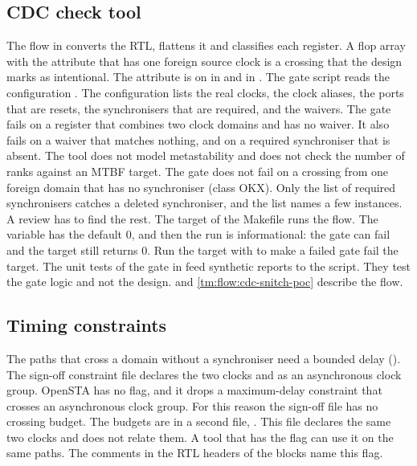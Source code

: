 \subsection*{CDC check tool}
The flow in  converts the RTL, flattens it and classifies each register. A flop array with the attribute  that has one foreign source clock is a crossing that the design marks as intentional. The attribute is on  in  and in . The gate script  reads the configuration . The configuration lists the real clocks, the clock aliases, the ports that are resets, the synchronisers that are required, and the waivers. The gate fails on a register that combines two clock domains and has no waiver. It also fails on a waiver that matches nothing, and on a required synchroniser that is absent. The tool does not model metastability and does not check the number of ranks against an MTBF target. The gate does not fail on a crossing from one foreign domain that has no synchroniser (class OKX). Only the list of required synchronisers catches a deleted synchroniser, and the list names a few instances. A review has to find the rest. The target  of the  Makefile runs the flow. The variable  has the default 0, and then the run is informational: the gate can fail and the target still returns 0. Run the target with  to make a failed gate fail the target. The unit tests of the gate in  feed synthetic reports to the script. They test the gate logic and not the design.  and \cref{tm:flow:cdc-snitch-poc} describe the flow.

\subsection*{Timing constraints}
The paths that cross a domain without a synchroniser need a bounded delay (). The sign-off constraint file  declares the two clocks  and  as an asynchronous clock group. OpenSTA has no  flag, and it drops a maximum-delay constraint that crosses an asynchronous clock group. For this reason the sign-off file has no crossing budget. The budgets are in a second file, . This file declares the same two clocks and does not relate them. A tool that has the flag  can use it on the same paths. The comments in the RTL headers of the blocks name this flag.

